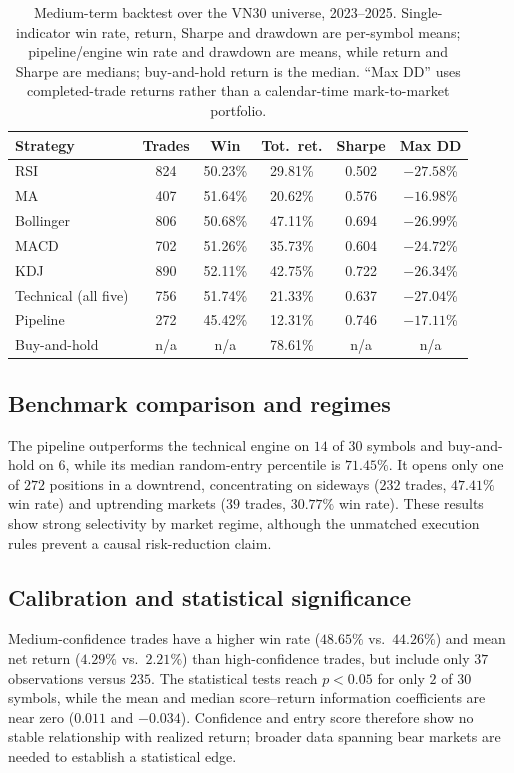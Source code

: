 \documentclass[runningheads]{llncs}
\begin{document}
\begin{table}[t]
\centering
\caption{Medium-term backtest over the VN30 universe, 2023--2025. Single-indicator
win rate, return, Sharpe and drawdown are per-symbol means; pipeline/engine win rate
and drawdown are means, while return and Sharpe are medians; buy-and-hold return is
the median. ``Max DD'' uses completed-trade returns rather than a calendar-time
mark-to-market portfolio.}
\label{tab:indicators}
\setlength{\tabcolsep}{4pt}
\small
\begin{tabular}{@{}lccccc@{}}
\toprule
Strategy & Trades & Win & Tot.\ ret. & Sharpe & Max DD \\
\midrule
RSI            & 824 & 50.23\% & 29.81\% & 0.502 & $-27.58$\% \\
MA             & 407 & 51.64\% & 20.62\% & 0.576 & $-16.98$\% \\
Bollinger      & 806 & 50.68\% & 47.11\% & 0.694 & $-26.99$\% \\
MACD           & 702 & 51.26\% & 35.73\% & 0.604 & $-24.72$\% \\
KDJ            & 890 & 52.11\% & 42.75\% & 0.722 & $-26.34$\% \\
\midrule
Technical (all five) & 756 & 51.74\% & 21.33\% & 0.637 & $-27.04$\% \\
Pipeline       & 272 & 45.42\% & 12.31\% & 0.746 & $-17.11$\% \\
Buy-and-hold   & n/a & n/a    & 78.61\% & n/a  & n/a       \\
\bottomrule
\end{tabular}
\end{table}

\subsection{Benchmark comparison and regimes}
The pipeline outperforms the technical engine on $14$ of $30$ symbols and
buy-and-hold on $6$, while its median random-entry percentile is $71.45\%$.
It opens only one of $272$ positions in a downtrend, concentrating on sideways
($232$ trades, $47.41\%$ win rate) and uptrending markets ($39$ trades, $30.77\%$
win rate). These results show strong selectivity by market regime, although the
unmatched execution rules prevent a causal risk-reduction claim.

\subsection{Calibration and statistical significance}
Medium-confidence trades have a higher win rate ($48.65\%$ vs.\ $44.26\%$) and mean
net return ($4.29\%$ vs.\ $2.21\%$) than high-confidence trades, but include only
$37$ observations versus $235$. The statistical tests reach $p<0.05$ for only $2$
of $30$ symbols, while the mean and median score--return information coefficients
are near zero ($0.011$ and $-0.034$). Confidence and entry score therefore show no
stable relationship with realized return; broader data spanning bear markets are
needed to establish a statistical edge.
\end{document}
